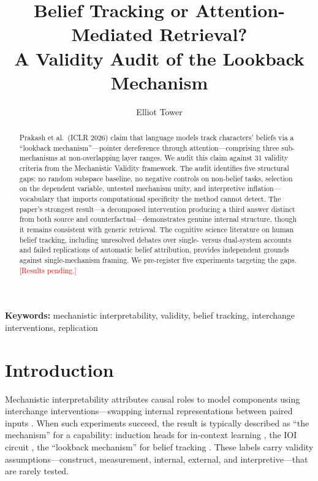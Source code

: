 \documentclass[11pt]{article}
\title{Belief Tracking or Attention-Mediated Retrieval?\\A Validity Audit of the Lookback Mechanism}
\author{Elliot Tower}
\affil{Independent Researcher \\ \texttt{elliot@elliottower.ai}}
\begin{document}
\linenumbers
\maketitle

\begin{abstract}
Prakash et al.\ (ICLR 2026) claim that language models track characters' beliefs via a ``lookback mechanism''---pointer dereference through attention---comprising three sub-mechanisms at non-overlapping layer ranges. We audit this claim against 31 validity criteria from the Mechanistic Validity framework. The audit identifies five structural gaps: no random subspace baseline, no negative controls on non-belief tasks, selection on the dependent variable, untested mechanism unity, and interpretive inflation---vocabulary that imports computational specificity the method cannot detect. The paper's strongest result---a decomposed intervention producing a third answer distinct from both source and counterfactual---demonstrates genuine internal structure, though it remains consistent with generic retrieval. The cognitive science literature on human belief tracking, including unresolved debates over single- versus dual-system accounts and failed replications of automatic belief attribution, provides independent grounds against single-mechanism framing. We pre-register five experiments targeting the gaps. \textcolor{red}{[Results pending.]}
\end{abstract}

\noindent\textbf{Keywords:} mechanistic interpretability, validity, belief tracking, interchange interventions, replication


\section{Introduction}
\label{sec:intro}

Mechanistic interpretability attributes causal roles to model components using interchange interventions---swapping internal representations between paired inputs \citep{geiger2021causal, vig2020investigating}. When such experiments succeed, the result is typically described as ``the mechanism'' for a capability: induction heads for in-context learning \citep{olsson2022context}, the IOI circuit \citep{wang2023interpretability}, the ``lookback mechanism'' for belief tracking \citep{prakash2025lookback}. These labels carry validity assumptions---construct, measurement, internal, external, and interpretive---that are rarely tested.
\end{document}

